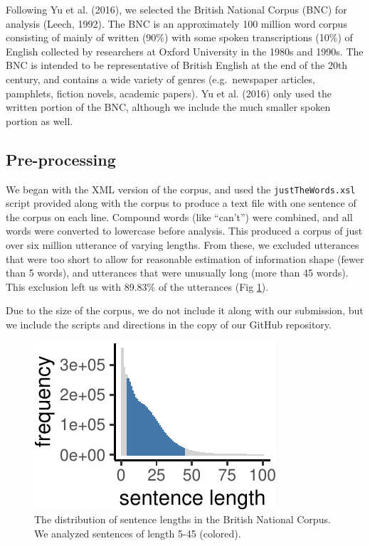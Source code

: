 \documentclass[man,floatsintext]{apa6}
\begin{document}
Following Yu et al. (2016), we selected the British National Corpus (BNC) for analysis (Leech, 1992). The BNC is an approximately 100 million word corpus consisting of mainly of written (90\%) with some spoken transcriptions (10\%) of English collected by researchers at Oxford University in the 1980s and 1990s. The BNC is intended to be representative of British English at the end of the 20th century, and contains a wide variety of genres (e.g.~newspaper articles, pamphlets, fiction novels, academic papers). Yu et al. (2016) only used the written portion of the BNC, although we include the much smaller spoken portion as well.

\hypertarget{pre-processing}{%
\subsection{Pre-processing}\label{pre-processing}}

We began with the XML version of the corpus, and used the \texttt{justTheWords.xsl} script provided along with the corpus to produce a text file with one sentence of the corpus on each line. Compound words (like \enquote{can't}) were combined, and all words were converted to lowercase before analysis. This produced a corpus of just over six million utterance of varying lengths. From these, we excluded utterances that were too short to allow for reasonable estimation of information shape (fewer than 5 words), and utterances that were unusually long (more than 45 words). This exclusion left us with 89.83\% of the utterances (Fig \ref{fig:bnc-lengths}).

Due to the size of the corpus, we do not include it along with our submission, but we include the scripts and directions in the copy of our GitHub repository.

\begin{figure}[tb]

{\centering \includegraphics{figs/bnc-lengths-1} 

}

\caption{The distribution of sentence lengths in the British National Corpus. We analyzed sentences of length 5-45 (colored).}\label{fig:bnc-lengths}
\end{figure}
\end{document}

